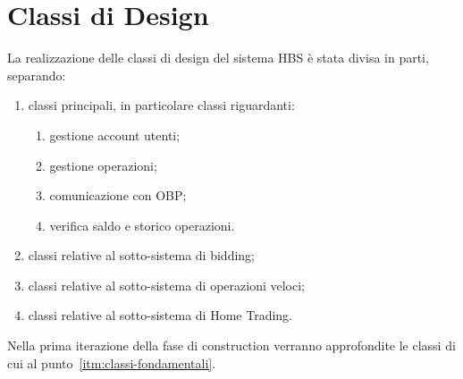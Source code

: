 
\section{Classi di Design}

La realizzazione delle classi di design del sistema HBS \`e stata divisa in parti, separando:
\begin{enumerate}
	\item \label{itm:classi-fondamentali} classi principali, in particolare classi riguardanti:
		\begin{enumerate}
			\item gestione account utenti;
			\item gestione operazioni;
			\item comunicazione con OBP;
			\item verifica saldo e storico operazioni.
		\end{enumerate}
	\item classi relative al sotto-sistema di bidding;
	\item classi relative al sotto-sistema di operazioni veloci;
	\item classi relative al sotto-sistema di Home Trading.
\end{enumerate}

Nella prima iterazione della fase di construction verranno approfondite le classi di cui al punto~\ref{itm:classi-fondamentali}.



